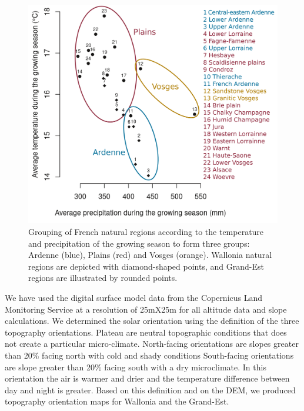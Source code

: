 \documentclass[3p,procedia]{elsarticle}
\begin{document}
\begin{figure}
	\centering
	\includegraphics[width=0.8\linewidth]{climat/climat_region.png}
	\caption{Grouping of French natural regions according to the temperature and precipitation of the growing season to form three groups: Ardenne (blue), Plains (red) and Vosges (orange). Wallonia natural regions are depicted with diamond-shaped points, and Grand-Est regions are illustrated by rounded points.}
	\label{fig:clim}
\end{figure}



We have used the digital surface model data from the Copernicus Land Monitoring Service \citep{DEM_copernicus}  at a resolution of 25mX25m for all altitude data and slope calculations.
We determined the solar orientation using the \cite{Delvaux_galoux} definition of the three topography orientations.
Plateau are neutral topographic conditions that does not create a particular micro-climate. 
North-facing orientations are slopes greater than  20\% facing north with cold and shady conditions
South-facing orientations are slope greater than  20\% facing south with a dry microclimate.
In this orientation the air is warmer and drier and the temperature difference between day and night is greater.
Based on this definition and on the DEM, we produced topography orientation  maps for Wallonia and the Grand-Est.
\end{document}
